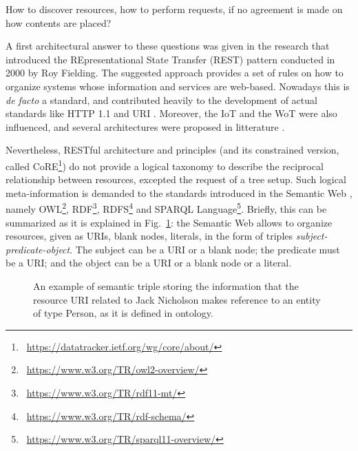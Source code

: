 How to discover resources, how to perform requests, if no agreement is made on how contents are placed?

A first architectural answer to these questions was given in the research that introduced the REpresentational State Transfer (REST) pattern \cite{fielding2002principled} conducted in 2000 by Roy Fielding. The suggested approach provides a set of rules on how to organize systems whose information and services are web-based. Nowadays this is \textit{de facto} a standard, and contributed heavily to the development of actual standards like HTTP 1.1 \cite{fielding2014hypertext} and URI \cite{berners1998uniform}. Moreover, the IoT and the WoT were also influenced, and several architectures were proposed in litterature \cite{cheng2018lightweight, laine2012restful, guinard2011internet}.

Nevertheless, RESTful architecture and principles (and its constrained version, called CoRE\footnote{\faLink~\url{https://datatracker.ietf.org/wg/core/about/}}) do not provide a logical taxonomy to describe the reciprocal relationship between resources, excepted the request of a tree setup. Such logical meta-information is demanded to the standards introduced in the Semantic Web \cite{berners2001semantic, shadbolt2006semantic}, namely OWL\footnote{\faLink~\url{https://www.w3.org/TR/owl2-overview/}}, RDF\footnote{\faLink~\url{https://www.w3.org/TR/rdf11-mt/}}, RDFS\footnote{\faLink~\url{https://www.w3.org/TR/rdf-schema/}} and SPARQL Language\footnote{\faLink~\url{https://www.w3.org/TR/sparql11-overview/}}. Briefly, this can be summarized as it is explained in Fig.~\ref{fig:semantic_web_example}: the Semantic Web allows to organize resources, given as URIs, blank nodes, literals, in the form of triples \textit{subject-predicate-object}. The subject can be a URI or a blank node; the predicate must be a URI; and the object can be a URI or a blank node or a literal.

\begin{figure}
\begin{center}
\end{center}
\caption{An example of semantic triple storing the information that the resource URI related to Jack Nicholson makes reference to an entity of type Person, as it is defined in  ontology.}
\label{fig:semantic_web_example}
\end{figure}

